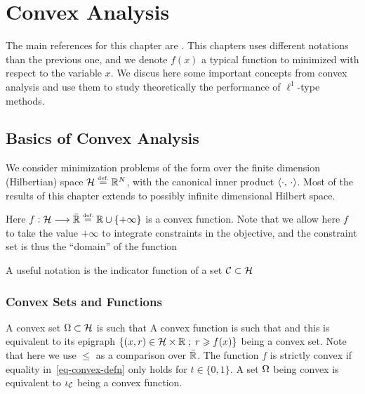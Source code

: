
\chapter{Convex Analysis}
\label{chap-convex-optim}

The main references for this chapter are \cite{ciarlet1982introduction,boyd2004convex}.
%
This chapters uses different notations than the previous one, and we denote $f(x)$ a typical function to minimized with respect to the variable $x$. 
%
We discus here some important concepts from convex analysis and use them to study theoretically the performance of $\ell^1$-type methods.


\section{Basics of Convex Analysis}

We consider minimization problems of the form
over the finite dimension (Hilbertian) space $\mathcal{H} \stackrel{\mbox{\upshape\tiny def.}}{=} \mathbb{R}^N$, with the canonical inner product $\langle \cdot,\,\cdot\rangle$. 
%
Most of the results of this chapter extends to possibly infinite dimensional Hilbert space. 

Here $f : \mathcal{H} \longrightarrow \bar {\mathbb{R}} \stackrel{\mbox{\upshape\tiny def.}}{=} \mathbb{R} \cup \{+\infty\}$ is a convex function. Note that we allow here $f$ to take the value $+\infty$ to integrate constraints in the objective, and the constraint set is thus the ``domain'' of the function

A useful notation is the indicator function of a set $\mathcal{C} \subset \mathcal{H}$


\subsection{Convex Sets and Functions}

A convex set $\Omega \subset \mathcal{H}$ is such that
A convex function is such that 
and this is equivalent to its epigraph $\left\{ (x,r) \in \mathcal{H} \times \mathbb{R} \;;\; r \geqslant f(x) \right\}$ being a convex set. Note that here we use $\leq$ as a comparison over $\bar{\mathbb{R}}$. 
%
The function $f$ is strictly convex if equality in~\eqref{eq-convex-defn} only holds for $t \in \{0,1\}$.
%
A set $\Omega$ being convex is equivalent to $\iota_{\mathcal{C}}$ being a convex function.

